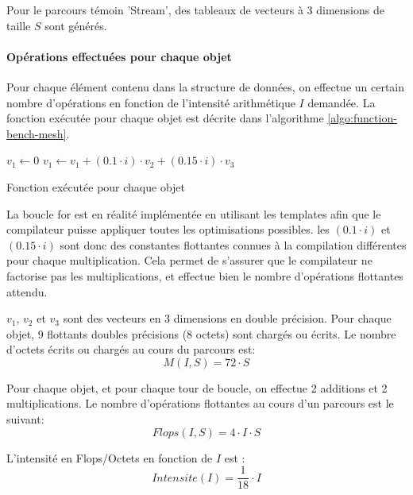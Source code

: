 Pour le parcours témoin 'Stream', des tableaux de vecteurs à 3 dimensions de taille $S$ sont générés.

\paragraph{Opérations effectuées pour chaque objet}

Pour chaque élément contenu dans la structure de données, on effectue un certain nombre d'opérations en fonction de l'intensité arithmétique $I$ demandée. La fonction exécutée pour chaque objet est décrite dans l'algorithme \ref{algo:function-bench-mesh}. 

\begin{algorithm}[H]
	\SetAlgoLined
	\LinesNumbered
	\SetAlgoNoEnd	
	\DontPrintSemicolon
	
	$v_1 \leftarrow 0$\;
	{
		$v_1 \leftarrow v_1 + (0.1 \cdot i )\cdot v_2 + (0.15 \cdot i) \cdot v_3$\;
	}
	
	\caption{Fonction exécutée pour chaque objet}
\end{algorithm}

La boucle for est en réalité implémentée en utilisant les templates afin que le compilateur puisse appliquer toutes les optimisations possibles. les $(0.1 \cdot i)$ et $(0.15 \cdot i)$ sont donc des constantes flottantes connues à la compilation différentes pour chaque multiplication. Cela permet de s'assurer que le compilateur ne factorise pas les multiplications, et effectue bien le nombre d'opérations flottantes attendu.

$v_1$, $v_2$ et $v_3$ sont des vecteurs en 3 dimensions en double précision. Pour chaque objet, 9 flottants doubles précisions (8 octets) sont chargés ou écrits. Le nombre d'octets écrits ou chargés au cours du parcours est:
\begin{equation}
	M(I,S) = 72 \cdot S
\end{equation}

Pour chaque objet, et pour chaque tour de boucle, on effectue 2 additions et 2 multiplications. Le nombre d'opérations flottantes au cours d'un parcours est le suivant:
\begin{equation}
	Flops(I,S) = 4 \cdot I \cdot S
\end{equation}

L'intensité en Flops/Octets en fonction de $I$ est :
\begin{equation}
	Intensite(I) = \frac{1}{18} \cdot I
\end{equation}

